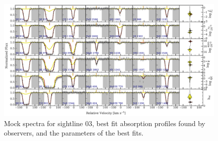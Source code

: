 \documentclass[fleqn,usenatbib]{mnras}
\begin{document}
\begin{figure}
    \centering
    \includegraphics[width=\textwidth]{figures/sample2/best_fits/0003.pdf}
    \caption{
    Mock spectra for sightline 03,
    best fit absorption profiles found by observers,
    and the parameters of the best fits.
    }
    \label{f: sample2 spectrum 03}
\end{figure}
\end{document}
